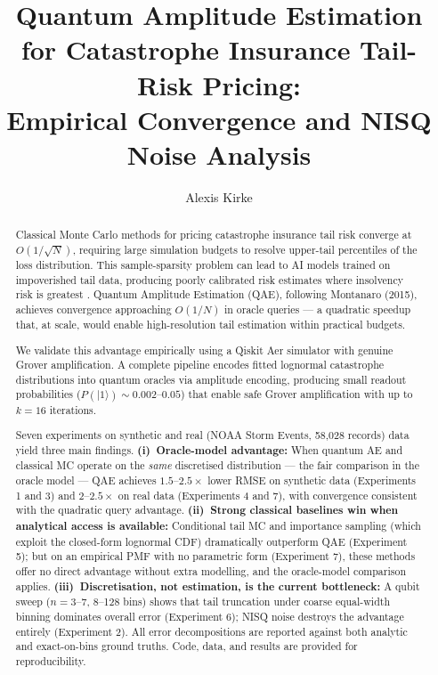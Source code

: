 \documentclass[11pt,a4paper]{article}
\title{Quantum Amplitude Estimation for Catastrophe Insurance Tail-Risk Pricing:\\ Empirical Convergence and NISQ Noise Analysis}
\author{Alexis Kirke}
\date{}
\begin{document}
\maketitle

\begin{abstract}
Classical Monte Carlo methods for pricing catastrophe insurance tail risk converge at $O(1/\sqrt{N})$, requiring large simulation budgets to resolve upper-tail percentiles of the loss distribution. This sample-sparsity problem can lead to AI models trained on impoverished tail data, producing poorly calibrated risk estimates where insolvency risk is greatest \citep{embrechts1997modelling}. Quantum Amplitude Estimation (QAE), following Montanaro (2015), achieves convergence approaching $O(1/N)$ in oracle queries --- a quadratic speedup that, at scale, would enable high-resolution tail estimation within practical budgets.

We validate this advantage empirically using a Qiskit Aer simulator with genuine Grover amplification. A complete pipeline encodes fitted lognormal catastrophe distributions into quantum oracles via amplitude encoding, producing small readout probabilities ($P(|1\rangle) \sim 0.002$--$0.05$) that enable safe Grover amplification with up to $k = 16$ iterations.

Seven experiments on synthetic and real (NOAA Storm Events, 58{,}028 records) data yield three main findings. \textbf{(i)~Oracle-model advantage:} When quantum AE and classical MC operate on the \emph{same} discretised distribution --- the fair comparison in the oracle model --- QAE achieves $1.5$--$2.5\times$ lower RMSE on synthetic data (Experiments 1 and 3) and $2$--$2.5\times$ on real data (Experiments 4 and 7), with convergence consistent with the quadratic query advantage. \textbf{(ii)~Strong classical baselines win when analytical access is available:} Conditional tail MC and importance sampling (which exploit the closed-form lognormal CDF) dramatically outperform QAE (Experiment 5); but on an empirical PMF with no parametric form (Experiment 7), these methods offer no direct advantage without extra modelling, and the oracle-model comparison applies. \textbf{(iii)~Discretisation, not estimation, is the current bottleneck:} A qubit sweep ($n = 3$--$7$, 8--128 bins) shows that tail truncation under coarse equal-width binning dominates overall error (Experiment 6); NISQ noise destroys the advantage entirely (Experiment 2). All error decompositions are reported against both analytic and exact-on-bins ground truths. Code, data, and results are provided for reproducibility.
\end{abstract}
\end{document}
